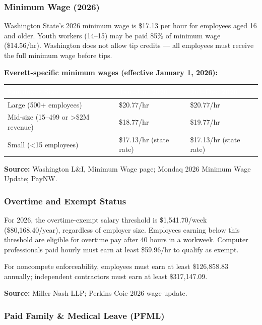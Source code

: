 \documentclass[11pt,letterpaper]{article}
\newcommand{\tableheader}[1]{\textbf{\sffamily\textcolor{white}{#1}}}
\begin{document}
\subsubsection{Minimum Wage (2026)}

Washington State's 2026 minimum wage is \$17.13 per hour for employees aged 16 and older. Youth workers (14--15) may be paid 85\% of minimum wage (\$14.56/hr). Washington does not allow tip credits --- all employees must receive the full minimum wage before tips.

\textbf{Everett-specific minimum wages (effective January 1, 2026):}

\begin{center}
\begin{tabularx}{\textwidth}{XC{3cm}C{3cm}}
\toprule
{}
\tableheader{Employer Size} & \tableheader{Jan--Jun 2026} & \tableheader{Jul--Dec 2026} \\
\midrule
Large (500+ employees) & \$20.77/hr & \$20.77/hr \\
Mid-size (15--499 or >\$2M revenue) & \$18.77/hr & \$19.77/hr \\
Small (<15 employees) & \$17.13/hr (state rate) & \$17.13/hr (state rate) \\
\bottomrule
\end{tabularx}
\end{center}

\textbf{Source:} Washington L\&I, Minimum Wage page; Mondaq 2026 Minimum Wage Update; PayNW.

\subsubsection{Overtime and Exempt Status}

For 2026, the overtime-exempt salary threshold is \$1,541.70/week (\$80,168.40/year), regardless of employer size. Employees earning below this threshold are eligible for overtime pay after 40 hours in a workweek. Computer professionals paid hourly must earn at least \$59.96/hr to qualify as exempt.

For noncompete enforceability, employees must earn at least \$126,858.83 annually; independent contractors must earn at least \$317,147.09.

\textbf{Source:} Miller Nash LLP; Perkins Coie 2026 wage update.

\subsubsection{Paid Family \& Medical Leave (PFML)}
\end{document}
